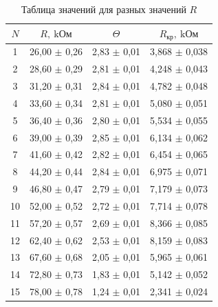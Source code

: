 \documentclass[a4paper,12pt]{article} %
\begin{document}
\begin{table}[ht]
\centering
\begin{tabular}{|c|c|c|c|}
\hline
$N$ & $R, \ \text{kОм}$ & $\Theta$ & $R_{\text{кр}}, \ \text{kОм}$ \\
\hline
1  & 26,00 $\pm$ 0,26   & 2,83 $\pm$ 0,01  & 3,868 $\pm$ 0,038   \\
2  & 28,60 $\pm$ 0,29   & 2,81 $\pm$ 0,01  & 4,248 $\pm$ 0,043   \\
3  & 31,20 $\pm$ 0,31   & 2,84 $\pm$ 0,01  & 4,782 $\pm$ 0,048   \\
4  & 33,60 $\pm$ 0,34   & 2,81 $\pm$ 0,01  & 5,080 $\pm$ 0,051   \\
5  & 36,40 $\pm$ 0,36   & 2,80 $\pm$ 0,01  & 5,534 $\pm$ 0,055   \\
6  & 39,00 $\pm$ 0,39   & 2,85 $\pm$ 0,01  & 6,134 $\pm$ 0,062   \\
7  & 41,60 $\pm$ 0,42   & 2,82 $\pm$ 0,01  & 6,454 $\pm$ 0,065   \\
8  & 44,20 $\pm$ 0,44   & 2,84 $\pm$ 0,01  & 6,975 $\pm$ 0,071   \\
9  & 46,80 $\pm$ 0,47   & 2,79 $\pm$ 0,01  & 7,179 $\pm$ 0,073   \\
10 & 52,00 $\pm$ 0,52   & 2,72 $\pm$ 0,01  & 7,714 $\pm$ 0,078   \\
11 & 57,20 $\pm$ 0,57   & 2,69 $\pm$ 0,01  & 8,366 $\pm$ 0,085   \\
12 & 62,40 $\pm$ 0,62   & 2,53 $\pm$ 0,01  & 8,159 $\pm$ 0,083   \\
13 & 67,60 $\pm$ 0,68   & 2,05 $\pm$ 0,01  & 5,965 $\pm$ 0,061   \\
14 & 72,80 $\pm$ 0,73   & 1,83 $\pm$ 0,01  & 5,142 $\pm$ 0,052   \\
15 & 78,00 $\pm$ 0,78   & 1,24 $\pm$ 0,01  & 2,341 $\pm$ 0,024   \\
\hline
\end{tabular}
\caption{Таблица значений для разных значений $R$}
\end{table}



\end{document}
